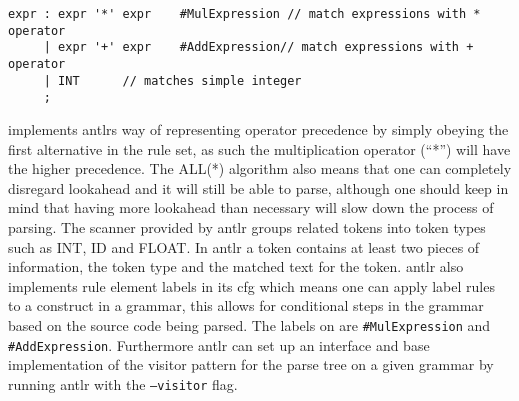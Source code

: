 \begin{lstlisting}[caption=An ambiguous rule for expr, which ANTLR handles by applying the first rule of the production if possible,frame=tlrb,label={lst:amb}]
expr : expr '*' expr 	#MulExpression // match expressions with * operator
     | expr '+' expr 	#AddExpression// match expressions with + operator
     | INT 		// matches simple integer
     ;
\end{lstlisting}
 implements \acrshort{antlr}s way of representing operator precedence by simply obeying the first alternative in the rule set, as such the multiplication operator (``*'') will have the higher precedence.
The ALL(*) algorithm also means that one can completely disregard lookahead and it will still be able to parse, although one should keep in mind that having more lookahead than necessary will slow down the process of parsing.
The scanner provided by \acrshort{antlr} groups related tokens into token types such as INT, ID and FLOAT.
In \acrshort{antlr} a token contains at least two pieces of information, the token type and the matched text for the token.
\acrshort{antlr} also implements rule element labels in its \acrfull{cfg} which means one can apply label rules to a construct in a grammar, this allows for conditional steps in the grammar based on the source code being parsed.
The labels on  are \texttt{\#MulExpression} and \texttt{\#AddExpression}.
Furthermore \acrshort{antlr} can set up an interface and base implementation of the visitor pattern for the parse tree on a given grammar by running \acrshort{antlr} with the \texttt{--visitor} flag. \citep{ALLSTAR, LLSTAR, antlr4_Book}
